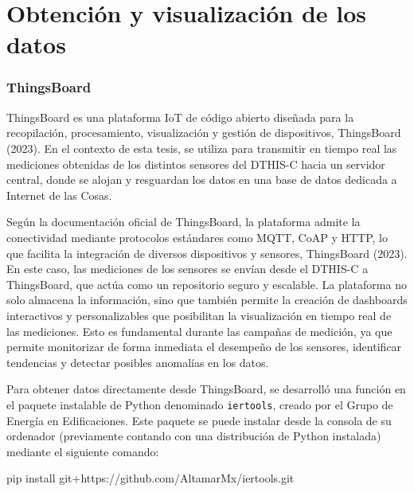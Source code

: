 \documentclass[
  letterpaper,
]{scrbook}
\newenvironment{Shaded}{\begin{snugshade}}{\end{snugshade}}
\newcommand{\NormalTok}[1]{\textcolor[rgb]{0.00,0.23,0.31}{#1}}
\newcommand{\OperatorTok}[1]{\textcolor[rgb]{0.37,0.37,0.37}{#1}}
\begin{document}
\section{Obtención y visualización de los
datos}\label{obtenciuxf3n-y-visualizaciuxf3n-de-los-datos}

\subsubsection{ThingsBoard}\label{thingsboard}

ThingsBoard es una plataforma IoT de código abierto diseñada para la
recopilación, procesamiento, visualización y gestión de dispositivos,
ThingsBoard (2023). En el contexto de esta tesis, se utiliza para
transmitir en tiempo real las mediciones obtenidas de los distintos
sensores del DTHIS-C hacia un servidor central, donde se alojan y
resguardan los datos en una base de datos dedicada a Internet de las
Cosas.

Según la documentación oficial de ThingsBoard, la plataforma admite la
conectividad mediante protocolos estándares como MQTT, CoAP y HTTP, lo
que facilita la integración de diversos dispositivos y sensores,
ThingsBoard (2023). En este caso, las mediciones de los sensores se
envían desde el DTHIS-C a ThingsBoard, que actúa como un repositorio
seguro y escalable. La plataforma no solo almacena la información, sino
que también permite la creación de dashboards interactivos y
personalizables que posibilitan la visualización en tiempo real de las
mediciones. Esto es fundamental durante las campañas de medición, ya que
permite monitorizar de forma inmediata el desempeño de los sensores,
identificar tendencias y detectar posibles anomalías en los datos.

Para obtener datos directamente desde ThingsBoard, se desarrolló una
función en el paquete instalable de Python denominado \texttt{iertools},
creado por el Grupo de Energía en Edificaciones. Este paquete se puede
instalar desde la consola de su ordenador (previamente contando con una
distribución de Python instalada) mediante el siguiente comando:

\begin{Shaded}
\begin{Highlighting}[]
\NormalTok{pip install git}\OperatorTok{+}\NormalTok{https:}\OperatorTok{//}\NormalTok{github.com}\OperatorTok{/}\NormalTok{AltamarMx}\OperatorTok{/}\NormalTok{iertools.git}
\end{Highlighting}
\end{Shaded}
\end{document}
